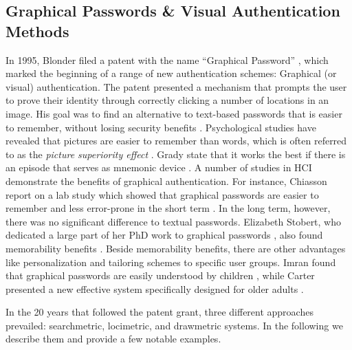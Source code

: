 	\subsection{Graphical Passwords \& Visual Authentication Methods}\label{sec:rw:graphical_pws}
	In 1995, Blonder filed a patent with the name ``Graphical Password'' \cite{Blonder1996PatentGraphicalPW}, which marked the beginning of a range of new authentication schemes: Graphical (or visual) authentication. The patent presented a mechanism that prompts the user to prove their identity through correctly clicking a number of locations in an image. His goal was to find an alternative to text-based passwords that is easier to remember, without losing security benefits \cite{Biddle2009GraphicalFirstTwelveYears, Renaud2009VisualSnakeOil}. Psychological studies have revealed that pictures are easier to remember than words, which is often referred to as the \textit{picture superiority effect} \cite{Paivio1968PicturesEasierThanWords}. Grady \etal state that it works the best if there is an episode that serves as mnemonic device \cite{Grady1998NeuralCorrelates}. A number of studies in HCI demonstrate the benefits of graphical authentication. For instance, Chiasson \etal report on a lab study which showed that graphical passwords are easier to remember and less error-prone in the short term \cite{Chiasson2009InterferencesGraphical}. In the long term, however, there was no significant difference to textual passwords. Elizabeth Stobert, who dedicated a large part of her PhD work to graphical passwords \cite{Stobert2015Dissertation}, also found memorability benefits \cite{Stobert2013GraphicalPasswords}. Beside memorability benefits, there are other advantages like personalization and tailoring schemes to specific user groups. Imran found that graphical passwords are easily understood by children \cite{Imran2015PWsAdultsChildren}, while Carter presented a new effective system specifically designed for older adults \cite{Carter2015GraphicalPasswordsOlderUsers}. 
	
	In the 20 years that followed the patent grant, three different approaches prevailed: searchmetric, locimetric, and drawmetric systems. In the following we describe them and provide a few notable examples. 
		
